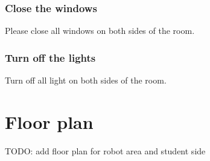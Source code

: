 \subsubsection{Close the windows}
Please close all windows on both sides of the room.

\subsubsection{Turn off the lights}
Turn off all light on both sides of the room.

\section{Floor plan}\label{sec:floorplan}
TODO: add floor plan for robot area and student side